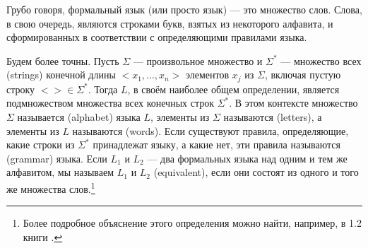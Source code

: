 Грубо говоря, формальный язык (или просто язык) — это множество слов. Слова, в свою очередь, являются строками букв, взятых из некоторого алфавита, и сформированных в соответствии с определяющими правилами языка.

Будем более точны. Пусть $\Sigma$ — произвольное множество и $\Sigma^*$ — множество всех  (strings) конечной длины $<x_1,\ldots,x_n>$ элементов $x_j$ из $\Sigma$, включая пустую строку $<>\in \Sigma^*$. Тогда  $L$, в своём наиболее общем определении, является подмножеством множества всех конечных строк $\Sigma^*$. В этом контексте множество $\Sigma$ называется  (alphabet) языка $L$, элементы из $\Sigma$ называются  (letters), а элементы из $L$ называются  (words).
Если существуют правила, определяющие, какие строки из $\Sigma^*$ принадлежат языку, а какие нет, эти правила называются  (grammar) языка. Если $L_1$ и $L_2$ — два формальных языка над одним и тем же алфавитом, мы называем $L_1$ и $L_2$  (equivalent), если они состоят из одного и того же множества слов.\footnote{Более подробное объяснение этого определения можно найти, например, в \secname{} 1.2 книги \cite{moll-2012}.}

